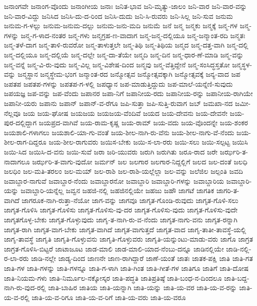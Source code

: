 ಜನಾಂಗವೇ
ಜನಾಂಗ-ವೊಂದು
ಜನಾಂಗೀಯ
ಜನಾಃ
ಜನಿತ-ಭಾವ
ಜನಿ-ಮೃತ್ಯು-ಜಾಲಂ
ಜನಿ-ವಾರ
ಜನಿ-ವಾರ-ವನ್ನು
ಜನಿ-ವಾರ-ವಿದ್ದು
ಜನಿಸಿದ
ಜನಿಸಿ-ದು-ದ-ರಿಂದ
ಜನಿಸಿ-ದುದು
ಜನಿ-ಸಿ-ರುವರು
ಜನಿ-ಸಿಲ್ಲ
ಜನಿ-ಸುವ
ಜನುಮ
ಜನುಮ-ಗ-ಳಲ್ಲು
ಜನುಮ-ಜನುಮ-ದಲ್ಲು
ಜನುಮ-ಜನು-ಮದಿ
ಜನುಮೆ
ಜನೆ
ಜನ್ಮ
ಜನ್ಮಕು
ಜನ್ಮಕ್ಕೆ
ಜನ್ಮ-ಗಳ
ಜನ್ಮ-ಗಳನ್ನು
ಜನ್ಮ-ಗ-ಳಾದ-ನಂತರ
ಜನ್ಮ-ಗಳು
ಜನ್ಮಗ್ರಹ-ಣ-ವಾದಾಗ
ಜನ್ಮ-ಜನ್ಮ-ದಲ್ಲಿಯೂ
ಜನ್ಮ-ಜನ್ಮಾಂತ-ರದಿ
ಜನ್ಮತಃ
ಜನ್ಮ-ತಳೆ-ದಾಗ
ಜನ್ಮ-ತಾಳಿ-ರುವರೋ
ಜನ್ಮ-ತಾಳುತ್ತಲೇ
ಜನ್ಮ-ತಿಥಿ
ಜನ್ಮ-ತಿಥಿಯ
ಜನ್ಮದ
ಜನ್ಮ-ದತ್ತ-ವಾಗಿ
ಜನ್ಮ-ದಲ್ಲಿ
ಜನ್ಮ-ದಲ್ಲಿಯೂ
ಜನ್ಮ-ದಲ್ಲಿಯೆ
ಜನ್ಮ-ದಲ್ಲೇ
ಜನ್ಮ-ದಾ-ತೆಯೇ
ಜನ್ಮದಿ
ಜನ್ಮ-ದಿನ
ಜನ್ಮ-ಧಾರ-ಣೆ-ಮಾಡಿ
ಜನ್ಮ-ವನ್ನು
ಜನ್ಮ-ವನ್ನೆ
ಜನ್ಮ-ವಿ-ರು-ವುದು
ಜನ್ಮ-ವಿಲ್ಲ
ಜನ್ಮ-ವಿಶೇಷ-ದಿಂದ
ಜನ್ಮವು
ಜನ್ಮ-ವೆತ್ತಿದ್ದೇನೆ
ಜನ್ಮ-ಸಂಸಿದ್ಧಸ್ತತೋ
ಜನ್ಮಸ್ಥಳ-ವನ್ನು
ಜನ್ಮಸ್ಥಾನ
ಜನ್ಮಸ್ಥೇಮ-ಭಂಗ
ಜನ್ಮಾಂತ-ರದ
ಜನ್ಮೋತ್ಸವ
ಜನ್ಮೋತ್ಸವಕ್ಕಾಗಿ
ಜನ್ಮೋತ್ಸವಕ್ಕೆ
ಜನ್ಯ-ವಾದ
ಜಪ
ಜಪತಪ
ಜಪತಪ-ಗಳನ್ನು
ಜಪತಪ-ಗ-ಳಲ್ಲಿ
ಜಪಧ್ಯಾನ
ಜಪ-ಮಾಡುತ್ತಿದ್ದುದು
ಜಪ-ಮಾಲೆ-ಯನ್ನೆಣಿ-ಸುವುದು
ಜಪಯಜ್ಞ
ಜಪ-ವನ್ನು
ಜಪ-ವೆಂದು
ಜಪಾನರ
ಜಪಾ-ನಿಗೆ
ಜಪಾನೀಯ-ರದು
ಜಪಾನೀಯ-ರನ್ನು
ಜಪಾನೀಯ-ರಾಗಿಯೇ
ಜಪಾನೀ-ಯರು
ಜಪಾನು
ಜಪಾನ್
ಜಪಾನ್‌-ವ-ರೆಗೂ
ಜಪಿ-ಸುತ್ತಾ
ಜಪಿ-ಸುತ್ತಿ-ರುವಾಗ
ಜಬ್
ಜಮಖಾ-ನದ
ಜಮೀ-ನೆಲ್ಲವೂ
ಜಯ
ಜಯ-ಘೋಷ
ಜಯಜಯ
ಜಯಜಯ-ವೆಂದಿವೆ
ಜಯದ
ಜಯ-ದೇವನು
ಜಯ-ದೇವನೇ
ಜಯ-ಪುರ-ದಲ್ಲಿದ್ದಾಗ
ಜಯಪ್ರದ-ವಾಗಿವೆ
ಜಯ-ರಾಮ-ಕೃಷ್ಣ
ಜಯ-ರಾಮ್
ಜಯ-ವದು
ಜಯ-ವೊಂದನ್ನೇ
ಜಯ-ಶಂಕರ
ಜಯಶಾಲಿ-ಗಳಾಗಲು
ಜಯಶಾಲಿ-ಯಾ-ಗು-ವಂತೆ
ಜಯ-ಶೀಲ-ನಾಗಿ-ರು-ವೆನು
ಜಯ-ಶೀಲ-ನಾಗು-ವೆ-ನೆಂದು
ಜಯ-ಶೀಲ-ರಾಗ-ದಿದ್ದರೂ
ಜಯ-ಶೀಲ-ರಾಗುವರು
ಜಯಿಸ-ಬೇಕು
ಜಯಿ-ಸ-ಲಾ-ರರು
ಜಯಿ-ಸಲು
ಜಯಿ-ಸಲ್ಪಟ್ಟ
ಜಯಿಸಿ
ಜಯಿ-ಸಿದ
ಜಯಿಸಿ-ದ-ವನು
ಜಯಿ-ಸುವೆ
ಜರಾ
ಜರಿ-ಯುವರು
ಜರುಗಿ
ಜರುಗಿತು
ಜರೂ-ರಾದ
ಜರೇ
ಜರ್ಝರಿ-ತ-ನಾದಾಗಲೂ
ಜರ್ಝರಿ-ತ-ವಾಗು-ವುದೋ
ಜರ್ಮನ್
ಜಲ
ಜಲಗಾರ
ಜಲಗಾರ-ನಿದ್ದಲ್ಲಿಗೆ
ಜಲದ
ಜಲ-ದಂತೆ
ಜಲಧಿ
ಜಲಧಿಂ
ಜಲ-ಮತಿ-ತರಲಂ
ಜಲ-ಮಯ್
ಜಲ-ರಾಶಿ
ಜಲ-ರಾಶಿ-ಯಲ್ಲೆಲ್ಲಾ
ಜಲ-ವನ್ನು
ಜಲೆಜಿಲ
ಜಲ್ಪಂತಿ
ಜವದಿ
ಜವಾಬ್ದಾರ-ನಾಗುವೆ
ಜವಾಬ್ದಾರ-ನೆಂದು
ಜವಾಬ್ದಾರನೋ
ಜವಾಬ್ದಾರಿ
ಜವಾಬ್ದಾರಿ-ಗಳನ್ನು
ಜವಾಬ್ದಾರಿಯ
ಜವಾಬ್ದಾರಿ-ಯನ್ನು
ಜವಾಬ್ದಾರಿ-ಯನ್ನೆಲ್ಲ
ಜವ್ವನ
ಜಹಜಿ-ನಲ್ಲಿ
ಜಹಜಿನಲ್ಲಿಯೇ
ಜಹಜು
ಜಹೌ
ಜಾಗಟೆ
ಜಾಗತಿಕ
ಜಾಗರಿ-ತ-ವಾಗಿದೆ
ಜಾಗರೂಕ-ನಾಗಿ-ರುತ್ತಾ-ನೆಯೋ
ಜಾಗ-ವನ್ನು
ಜಾಗವೂ
ಜಾಗೃತ-ಗೊಂಡಿ-ರುವುದು
ಜಾಗೃತ-ಗೊಳಿ-ಸಲು
ಜಾಗೃತ-ಗೊಳಿಸಿ
ಜಾಗೃತ-ಗೊಳಿಸು
ಜಾಗೃತ-ಗೊಳಿಸು-ವು-ದರ
ಜಾಗೃತ-ಗೊಳಿಸು-ವುದು
ಜಾಗೃತ-ಗೊಳಿಸು-ವುದೇ
ಜಾಗೃತಗೊಳ್ಳ-ಬೇಕು
ಜಾಗೃತ-ಗೊಳ್ಳುವುದು
ಜಾಗೃ-ತ-ನಾಗಿ-ರು-ವ-ನೆಂದು
ಜಾಗೃತ-ನಾಗು-ವನು
ಜಾಗೃತ-ರನ್ನಾಗಿ
ಜಾಗೃತ-ರಾಗಿ
ಜಾಗೃತ-ವಾಗ-ಬೇಕು
ಜಾಗೃತ-ವಾಗಿದೆ
ಜಾಗೃತ-ವಾಗುತ್ತದೆ
ಜಾಗೃತ-ವಾದ
ಜಾಗೃ-ತಾತೀ-ತಾವಸ್ಥೆ-ಯಲ್ಲಿ
ಜಾಗೃ-ತಾವಸ್ಥೆ
ಜಾಗೃತಿ
ಜಾಗೃತಿ-ಗೊಳ್ಳುವನು
ಜಾಗೃತಿ-ಗೊಳ್ಳುವರು
ಜಾಗೃತಿ-ಯನ್ನುಂಟು-ಮಾಡು-ವರು
ಜಾಗೊ
ಜಾಗ್ರತ
ಜಾಗ್ರತ-ಗೊಳಿಸಿ-ಬಿಟ್ಟರೆ
ಜಾಟಾಜೂಟ
ಜಾಡ-ಮಾಲಿ
ಜಾಡ-ಮಾಲಿ-ಯಾದ-ನೆಂಬು-ದನ್ನೂ
ಜಾಡಿನಲ್ಲಿಯೇ
ಜಾಡಿ-ನಲ್ಲಿ-ರ-ಲಾ-ರರು
ಜಾಡಿ-ನಲ್ಲೇ
ಜಾಡ್ಯ-ದಿಂದ
ಜಾಣನೇ
ಜಾಣ-ರಾಗಿದ್ದಾರೆ
ಜಾಣೆ-ಯಂತೆ
ಜಾತಃ
ಜಾತಕ-ಪಕ್ಷಿ
ಜಾತಿ
ಜಾತಿ-ಗತ
ಜಾತಿ-ಗಳ
ಜಾತಿ-ಗಳನ್ನು
ಜಾತಿ-ಗಳನ್ನೂ
ಜಾತಿ-ಗ-ಳಾಗಿ
ಜಾತಿ-ಗಿಂತ
ಜಾತಿ-ಗೀತೆ-ಗಳ
ಜಾತಿಗೂ
ಜಾತಿಗೆ
ಜಾತಿ-ದೋಷ
ಜಾತಿ-ನಿಯಮ-ಗಳು
ಜಾತಿ-ನಿರ್ಮೂಲ-ನಕ್ಕೋಸ್ಕರ
ಜಾತಿ-ಪದ್ಧತಿ
ಜಾತಿಪ್ರತಿಷ್ಠೆ
ಜಾತಿ-ಬಂಧ-ನ-ದಿಂದಲೂ
ಜಾತಿ-ಬದ್ದ-ನಾಗಿ-ರು-ವುದ-ರಲ್ಲಿ
ಜಾತಿ-ಬಾಹಿರ
ಜಾತಿಯ
ಜಾತಿ-ಯನ್ನಾಗಿ
ಜಾತಿ-ಯನ್ನು
ಜಾತಿ-ಯ-ವರ
ಜಾತಿ-ಯ-ವ-ರನ್ನು
ಜಾತಿ-ಯ-ವ-ರಲ್ಲಿ
ಜಾತಿ-ಯ-ವ-ರಿಗೂ
ಜಾತಿ-ಯ-ವ-ರಿಗೆ
ಜಾತಿ-ಯ-ವರು
ಜಾತಿ-ಯ-ವರೂ
